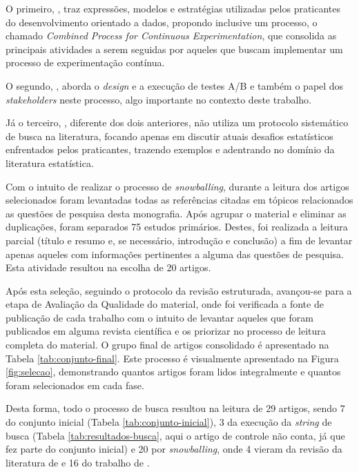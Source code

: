 O primeiro, , traz expressões, modelos e estratégias utilizadas pelos praticantes do desenvolvimento orientado a dados, propondo inclusive um processo, o chamado \textit{Combined Process for Continuous Experimentation}, que consolida as principais atividades a serem seguidas por aqueles que buscam implementar um processo de experimentação contínua.

O segundo, , aborda o  \textit{design} e a execução de testes A/B e também o papel dos \textit{stakeholders} neste processo, algo importante no contexto deste trabalho. 

Já o terceiro, , diferente dos dois anteriores, não utiliza um protocolo sistemático de busca na literatura, focando apenas em discutir atuais desafios estatísticos enfrentados pelos praticantes, trazendo exemplos e adentrando no domínio da literatura estatística.

Com o intuito de realizar o processo de \textit{snowballing}, durante a leitura dos artigos selecionados foram levantadas todas as referências citadas em tópicos relacionados as questões de pesquisa desta monografia. Após agrupar o material e eliminar as duplicações, foram separados 75 estudos primários. Destes, foi realizada a leitura parcial (título e resumo e, se necessário, introdução e conclusão) a fim de levantar apenas aqueles com informações pertinentes a alguma das questões de pesquisa. Esta atividade resultou na escolha de 20 artigos.

Após esta seleção, seguindo o protocolo da revisão estruturada, avançou-se para a etapa de Avaliação da Qualidade do material, onde foi verificada a fonte de publicação de cada trabalho com o intuito de levantar aqueles que foram publicados em alguma revista científica e os priorizar no processo de leitura completa do material. O grupo final de artigos consolidado é apresentado na Tabela \ref{tab:conjunto-final}. Este processo é visualmente apresentado na Figura \ref{fig:selecao}, demonstrando quantos artigos foram lidos integralmente e quantos foram selecionados em cada fase.

Desta forma, todo o processo de busca resultou na leitura de 29 artigos, sendo 7 do conjunto inicial (Tabela \ref{tab:conjunto-inicial}), 3 da execução da \textit{string} de busca (Tabela \ref{tab:resultados-busca}, aqui o artigo de controle não conta, já que fez parte do conjunto inicial) e 20 por \textit{snowballing}, onde 4 vieram da revisão da literatura de  \cite{yu_new_2020, chen_automatic_2018, fabijan_benefits_2017, le_goues_towards_2014} e 16 do trabalho de  \cite{kuhrmann_activity_2018, bures_infrastructure_2021, kevic_characterizing_2017, liu_enterprise-level_2019, olsson_opinions_2014, fernandes_hitting_2015, melegati_hypotheses_2019, kohavi_online_2013, crook_seven_2009, issa_mattos_hurrier_2023, fabijan_online_2020, fagerholm_right_2017, fabijan_three_2019, olsson_towards_2015, sauvola_towards_2015, melegati_understanding_2021}.

